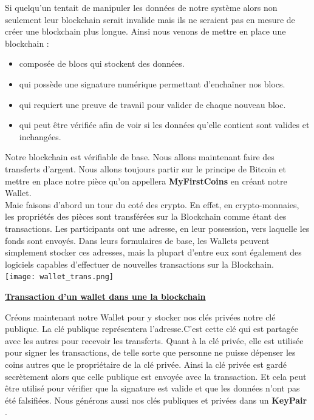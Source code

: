 \documentclass[12pt]{report}
\begin{document}
\hspace{1cm} Si quelqu'un tentait de manipuler les données de notre système alors non seulement leur blockchain serait invalide mais ils ne seraient pas en mesure de créer une blockchain plus longue. Ainsi nous venons de mettre en place une blockchain : 
\begin{itemize}
    \item composée de blocs qui stockent des données. 
    \item qui possède une signature numérique permettant d'enchaîner nos blocs. 
    \item qui requiert une preuve de travail pour valider de chaque nouveau bloc.
    \item qui peut être vérifiée afin de voir si les données qu'elle contient sont valides et inchangées.
\end{itemize}

\hspace{1cm} Notre blockchain est vérifiable de base. Nous allons maintenant faire des transferts d'argent. Nous allons toujours partir sur le principe de Bitcoin et mettre en place notre pièce qu'on appellera \textbf{MyFirstCoins} en créant notre Wallet. \\
Maie faisons d'abord un tour du coté des crypto. En effet, en crypto-monnaies, les propriétés des pièces sont transférées sur la Blockchain comme étant des transactions. Les participants ont une adresse, en leur possession, vers laquelle les fonds sont envoyés. Dans leurs formulaires de base, les Wallets peuvent simplement stocker ces adresses, mais la plupart d'entre eux sont également des logiciels capables d'effectuer de nouvelles transactions sur la Blockchain.\\

\texttt{[image: wallet\_trans.png]}
\begin{center}
     \textbf{\underline{Transaction d'un wallet dans une la blockchain}} \\[1cm]
\end{center}


Créons maintenant notre Wallet pour y stocker nos clés privées notre clé publique.  
\hspace{1cm} La clé publique représentera l’adresse.C'est cette clé qui est partagée avec les autres pour recevoir les transferts. Quant à la clé privée, elle est utilisée pour signer les transactions, de telle sorte que personne ne puisse dépenser les coins autres que le propriétaire de la clé privée. Ainsi la clé privée est gardé secrètement alors que celle publique est envoyée avec la transaction. Et cela peut être utilisé pour vérifier que la signature est valide et que les données n'ont pas été falsifiées. Nous générons aussi nos clés publiques et privées dans un \textbf{KeyPair} .
\end{document}
